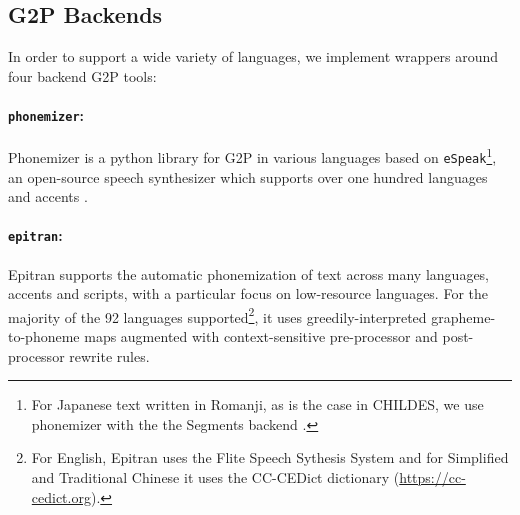 

\subsection{G2P Backends}\label{sec:13-backends}

In order to support a wide variety of languages, we implement wrappers around four backend G2P tools:


\paragraph{\texttt{phonemizer}:} Phonemizer \citep{Bernard2021} is a python library for G2P in various languages based on \texttt{eSpeak}\footnote{For Japanese text written in Romanji, as is the case in CHILDES, we use phonemizer with the the Segments backend \citep{robert_forkel_2019_3549784}.}, an open-source speech synthesizer which supports over one hundred languages and accents \citep{Dunn2019}.

\paragraph{\texttt{epitran}:} Epitran \citep{Mortensen-et-al:2018} supports the automatic phonemization of text across many languages, accents and scripts, with a particular focus on low-resource languages. For the majority of the 92 languages supported\footnote{For English, Epitran uses the Flite Speech Sythesis System \citep{black2001flite} and for Simplified and Traditional Chinese it uses the CC-CEDict dictionary (\url{https://cc-cedict.org}).}, it uses greedily-interpreted grapheme-to-phoneme maps augmented with context-sensitive pre-processor and post-processor rewrite rules.

